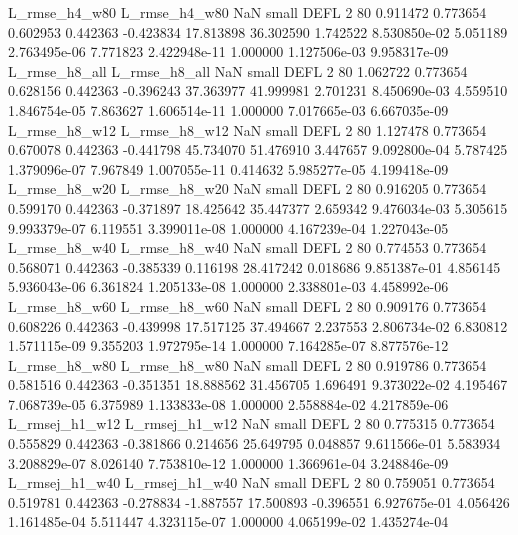  L_rmse_h4_w80  L_rmse_h4_w80                   NaN      small     DEFL                 2 80 0.911472       0.773654 0.602953       0.442363   -0.423834     17.813898     36.302590     1.742522   8.530850e-02  5.051189 2.763495e-06     7.771823   2.422948e-11            1.000000    1.127506e-03        9.958317e-09
 L_rmse_h8_all  L_rmse_h8_all                   NaN      small     DEFL                 2 80 1.062722       0.773654 0.628156       0.442363   -0.396243     37.363977     41.999981     2.701231   8.450690e-03  4.559510 1.846754e-05     7.863627   1.606514e-11            1.000000    7.017665e-03        6.667035e-09
 L_rmse_h8_w12  L_rmse_h8_w12                   NaN      small     DEFL                 2 80 1.127478       0.773654 0.670078       0.442363   -0.441798     45.734070     51.476910     3.447657   9.092800e-04  5.787425 1.379096e-07     7.967849   1.007055e-11            0.414632    5.985277e-05        4.199418e-09
 L_rmse_h8_w20  L_rmse_h8_w20                   NaN      small     DEFL                 2 80 0.916205       0.773654 0.599170       0.442363   -0.371897     18.425642     35.447377     2.659342   9.476034e-03  5.305615 9.993379e-07     6.119551   3.399011e-08            1.000000    4.167239e-04        1.227043e-05
 L_rmse_h8_w40  L_rmse_h8_w40                   NaN      small     DEFL                 2 80 0.774553       0.773654 0.568071       0.442363   -0.385339      0.116198     28.417242     0.018686   9.851387e-01  4.856145 5.936043e-06     6.361824   1.205133e-08            1.000000    2.338801e-03        4.458992e-06
 L_rmse_h8_w60  L_rmse_h8_w60                   NaN      small     DEFL                 2 80 0.909176       0.773654 0.608226       0.442363   -0.439998     17.517125     37.494667     2.237553   2.806734e-02  6.830812 1.571115e-09     9.355203   1.972795e-14            1.000000    7.164285e-07        8.877576e-12
 L_rmse_h8_w80  L_rmse_h8_w80                   NaN      small     DEFL                 2 80 0.919786       0.773654 0.581516       0.442363   -0.351351     18.888562     31.456705     1.696491   9.373022e-02  4.195467 7.068739e-05     6.375989   1.133833e-08            1.000000    2.558884e-02        4.217859e-06
L_rmsej_h1_w12 L_rmsej_h1_w12                   NaN      small     DEFL                 2 80 0.775315       0.773654 0.555829       0.442363   -0.381866      0.214656     25.649795     0.048857   9.611566e-01  5.583934 3.208829e-07     8.026140   7.753810e-12            1.000000    1.366961e-04        3.248846e-09
L_rmsej_h1_w40 L_rmsej_h1_w40                   NaN      small     DEFL                 2 80 0.759051       0.773654 0.519781       0.442363   -0.278834     -1.887557     17.500893    -0.396551   6.927675e-01  4.056426 1.161485e-04     5.511447   4.323115e-07            1.000000    4.065199e-02        1.435274e-04

